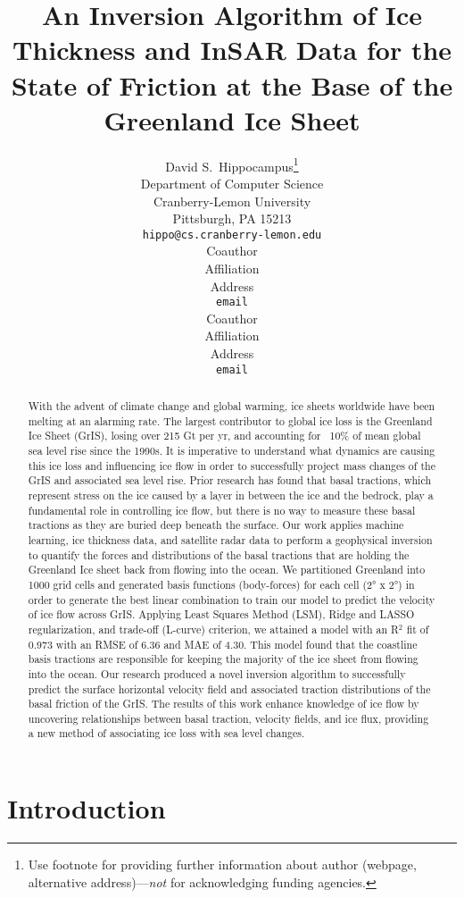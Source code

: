 \documentclass{article}
\title{An Inversion Algorithm of Ice Thickness and InSAR Data for
the State of Friction at the Base of the Greenland Ice Sheet}
\author{%
  David S.~Hippocampus\thanks{Use footnote for providing further information
    about author (webpage, alternative address)---\emph{not} for acknowledging
    funding agencies.} \\
  Department of Computer Science\\
  Cranberry-Lemon University\\
  Pittsburgh, PA 15213 \\
  \texttt{hippo@cs.cranberry-lemon.edu} \\
   \And
   Coauthor \\
   Affiliation \\
   Address \\
   \texttt{email} \\
   \AND
   Coauthor \\
   Affiliation \\
   Address \\
   \texttt{email} \\
}
\begin{document}
\maketitle

\begin{abstract}
With the advent of climate change and global warming, ice sheets worldwide have been melting at an alarming rate. The largest contributor to global ice loss is the Greenland Ice Sheet (GrIS), losing over 215 Gt per yr, and accounting for ~10\% of mean global sea level rise since the 1990s. It is imperative to understand what dynamics are causing this ice loss and influencing ice flow in order to successfully project mass changes of the GrIS and associated sea level rise. Prior research has found that basal tractions, which represent stress on the ice caused by a layer in between the ice and the bedrock, play a fundamental role in controlling ice flow, but there is no way to measure these basal tractions as they are buried deep beneath the surface. Our work applies machine learning, ice thickness data, and satellite radar data to perform a geophysical inversion to quantify the forces and distributions of the basal tractions that are holding the Greenland Ice sheet back from flowing into the ocean. We partitioned Greenland into 1000 grid cells and generated basis functions (body-forces) for each cell (2° x 2°) in order to generate the best linear combination to train our model to predict the velocity of ice flow across GrIS. Applying Least Squares Method (LSM), Ridge and LASSO regularization, and trade-off (L-curve) criterion, we attained a model with an R$^2$ fit of 0.973 with an RMSE of 6.36 and MAE of 4.30. This model found that the coastline basis tractions are responsible for keeping the majority of the ice sheet from flowing into the ocean. Our research produced a novel inversion algorithm to successfully predict the surface horizontal velocity field and associated traction distributions of the basal friction of the GrIS. The results of this work enhance knowledge of ice flow by uncovering relationships between basal traction, velocity fields, and ice flux, providing a new method of associating ice loss with sea level changes.
\end{abstract}

\section{Introduction}
\end{document}
